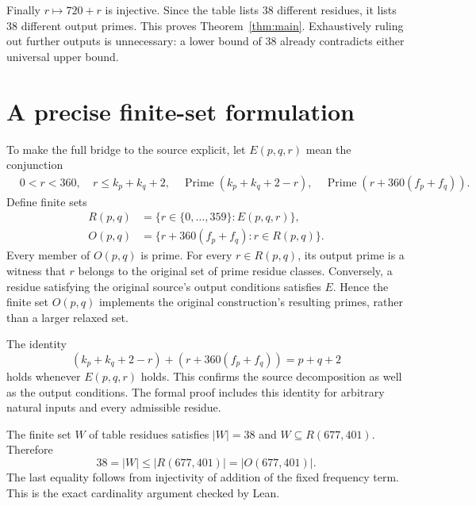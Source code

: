 \documentclass[11pt]{article}
\begin{document}
Finally $r\mapsto720+r$ is injective. Since the table lists 38 different residues, it lists 38 different output primes. This proves Theorem~\ref{thm:main}. Exhaustively ruling out further outputs is unnecessary: a lower bound of 38 already contradicts either universal upper bound.

\section{A precise finite-set formulation}
To make the full bridge to the source explicit, let $E(p,q,r)$ mean the conjunction
\begin{align*}
 &0<r<360,\
 &r\leq k_p+k_q+2,\
 &\operatorname{Prime}(k_p+k_q+2-r),\
 &\operatorname{Prime}(r+360(f_p+f_q)).
\end{align*}
Define finite sets
\begin{align*}
 R(p,q)&=\{r\in\{0,\ldots,359\}:E(p,q,r)\},\\
 O(p,q)&=\{r+360(f_p+f_q):r\in R(p,q)\}.
\end{align*}
Every member of $O(p,q)$ is prime. For every $r\in R(p,q)$, its output prime is a witness that $r$ belongs to the original set of prime residue classes. Conversely, a residue satisfying the original source's output conditions satisfies $E$. Hence the finite set $O(p,q)$ implements the original construction's resulting primes, rather than a larger relaxed set.

The identity
\[
 (k_p+k_q+2-r)+(r+360(f_p+f_q))=p+q+2
\]
holds whenever $E(p,q,r)$ holds. This confirms the source decomposition as well as the output conditions. The formal proof includes this identity for arbitrary natural inputs and every admissible residue.

The finite set $W$ of table residues satisfies $|W|=38$ and $W\subseteq R(677,401)$. Therefore
\[
 38=|W|\leq|R(677,401)|=|O(677,401)|.
\]
The last equality follows from injectivity of addition of the fixed frequency term. This is the exact cardinality argument checked by Lean.
\end{document}
